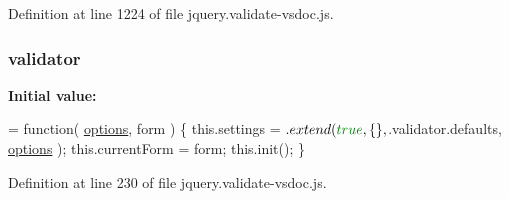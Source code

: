 Definition at line 1224 of file jquery.\+validate-\/vsdoc.\+js.

\hypertarget{jquery_8validate-vsdoc_8js_a2dc8272bb221cdffcccbd20db038f172}{}
\subsubsection[{validator}]{\setlength{\rightskip}{0pt plus 5cm}validator}\label{jquery_8validate-vsdoc_8js_a2dc8272bb221cdffcccbd20db038f172}
{\bfseries Initial value\+:}
\begin{DoxyCode}
= \textcolor{keyword}{function}( \hyperlink{obj_2_release_2_package_2_package_tmp_2_scripts_2dropzone_8js_a601a442fa75a5a2657a41da857c71b55}{options}, form ) \{
    this.settings = $.extend( \textcolor{keyword}{true}, \{\}, $.validator.defaults, \hyperlink{obj_2_release_2_package_2_package_tmp_2_scripts_2dropzone_8js_a601a442fa75a5a2657a41da857c71b55}{options} );
    this.currentForm = form;
    this.init();
\}
\end{DoxyCode}


Definition at line 230 of file jquery.\+validate-\/vsdoc.\+js.

